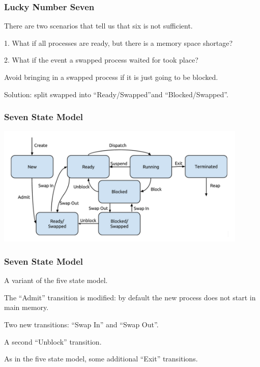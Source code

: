 \begin{frame}
\frametitle{Lucky Number Seven}

There are two scenarios that tell us that six is not sufficient.

1. What if all processes are ready, but there is a memory space shortage?

2. What if the event a swapped process waited for took place?

Avoid bringing in a swapped process if it is just going to be blocked.

Solution: split swapped into ``Ready/Swapped''and ``Blocked/Swapped''.

\end{frame}

\begin{frame}
\frametitle{Seven State Model}

\begin{center}
\includegraphics[width=0.9\textwidth]{images/7-state-model.png}
\end{center}

\end{frame}

\begin{frame}
\frametitle{Seven State Model}
A variant of the five state model.

The ``Admit'' transition is modified: by default the new process does not start in main memory.

Two new transitions: ``Swap In'' and ``Swap Out''.

A second ``Unblock'' transition.

As in the five state model, some additional ``Exit'' transitions.

\end{frame}




